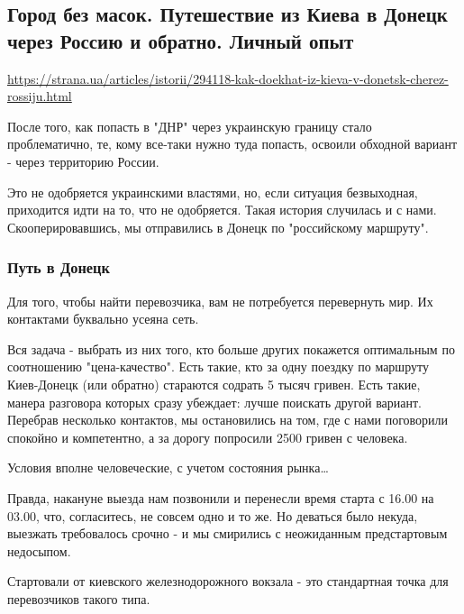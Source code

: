  
 

\subsection{Город без масок. Путешествие из Киева в Донецк через Россию и обратно. Личный опыт }
\url{https://strana.ua/articles/istorii/294118-kak-doekhat-iz-kieva-v-donetsk-cherez-rossiju.html}

После того, как попасть в "ДНР" через украинскую границу стало проблематично,
те, кому все-таки нужно туда попасть, освоили обходной вариант - через
территорию России.

Это не одобряется украинскими властями, но, если ситуация безвыходная,
приходится идти на то, что не одобряется. Такая история случилась и с нами.
Скооперировавшись, мы отправились в Донецк по "российскому маршруту".

\subsubsection{Путь в Донецк}

Для того, чтобы найти перевозчика, вам не потребуется перевернуть мир. Их
контактами буквально усеяна сеть.

Вся задача - выбрать из них того, кто больше других покажется оптимальным по
соотношению "цена-качество". Есть такие, кто за одну поездку по маршруту
Киев-Донецк (или обратно) стараются содрать 5 тысяч гривен. Есть такие, манера
разговора которых сразу убеждает: лучше поискать другой вариант. Перебрав
несколько контактов, мы остановились на том, где с нами поговорили спокойно и
компетентно, а за дорогу попросили 2500 гривен с человека.

Условия вполне человеческие, с учетом состояния рынка…

Правда, накануне выезда нам позвонили и перенесли время старта с 16.00 на
03.00, что, согласитесь, не совсем одно и то же. Но деваться было некуда,
выезжать требовалось срочно - и мы смирились с неожиданным предстартовым
недосыпом.

Стартовали от киевского железнодорожного вокзала - это стандартная точка для
перевозчиков такого типа.

